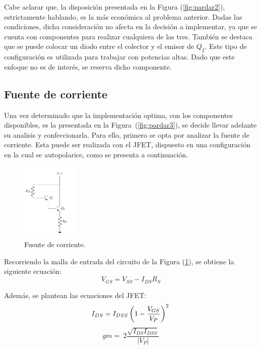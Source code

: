 Cabe aclarar que, la disposición presentada en la Figura (\ref{fig:pardar2}), estrictamente hablando, es la más económica al problema anterior. Dadas las condiciones, dicha consideración no afecta en la decisión a implementar, ya que se cuenta con componentes para realizar cualquiera de las tres. También se destaca que se puede colocar un diodo entre el colector y el emisor de $Q_2$. Este tipo de configuración es utilizada para trabajar con potencias altas. Dado que este enfoque no es de interés, se reserva dicho componente.

\subsection{Fuente de corriente}
\label{subsec:fdei}
Una vez determinado que la implementación optima, con los componentes disponibles, es la presentada en la Figura~(\ref{fig:pardar3}), se decide llevar adelante su analisis y confeccionarla. Para ello, primero se opta por analizar la fuente de corriente. Esta puede ser realizada con el JFET, dispuesto en una configuración en la cual se autopolarice, como se presenta a continuación.
\begin{figure}[H]
\centering
	\includegraphics[width=0.25\textwidth, page=4]{Imagenes/ParDarlington.pdf}
	\caption{Fuente de corriente.}
	\label{fig:fuentei}
\end{figure}

Recorriendo la malla de entrada del circuito de la Figura (\ref{fig:fuentei}), se obtiene la siguiente ecuación:
\begin{equation*}
	V_{GS} = V_{SS} - I_{DS} R_{S}
\end{equation*}

Además, se plantean las ecuaciones del JFET:
\begin{equation*}
	I_{DS} = I_{DSS} \left( 1 - \frac{V_{GS}}{V_P} \right)^2 \\
\end{equation*}
\begin{equation*}
	gm = \ 2\frac{\sqrt{I_{DS} I_{DSS}}}{|V_P|}
\end{equation*}


